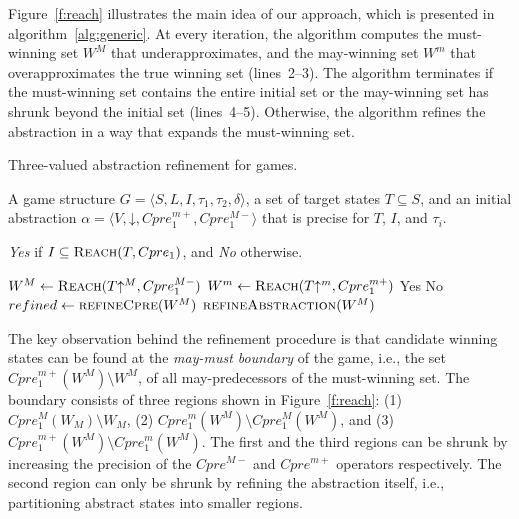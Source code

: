 \documentclass{article}
\newcommand{\reach}[0]{\textsc{Reach}}
\newcommand{\concrete}[1]{#1\mathord{\downarrow}}
\newcommand{\abstractm}[1]{#1\mathord{\uparrow^m}}
\newcommand{\abstractM}[1]{#1\mathord{\uparrow^M}}
\begin{document}
Figure~\ref{f:reach} illustrates the main idea of our approach, 
which is presented in algorithm~\ref{alg:generic}.  At every 
iteration, the algorithm computes the must-winning set $W^M$ that 
underapproximates, and the may-winning set $W^m$ that 
overapproximates the true winning set (lines~2--3).  The algorithm 
terminates if the must-winning set contains the entire initial set 
or the may-winning set has shrunk beyond the initial set 
(lines~4--5).  Otherwise, the algorithm refines the abstraction in 
a way that expands the must-winning set.

\begin{algorithm}[t]
\caption{Three-valued abstraction refinement for games.}
\label{alg:generic}

\begin{algorithmic}[1]

     A game structure $G = \langle S, L, I, \tau_1, \tau_2, \delta \rangle$, a set 
    of target states $T\subseteq S$, and an initial abstraction $\alpha=\langle V, \concrete{}, Cpre_1^{m+}, Cpre_1^{M-} \rangle$
    that is precise for $T$, $I$, and $\tau_i$.

     {\it Yes} if $I \subseteq \reach(T, Cpre_1)$, and {\it No} otherwise.

    \Loop
        \State $W^M \gets \reach(\abstractM{T}, Cpre_1^{M-})$
        \State $W^m \gets \reach(\abstractm{T}, Cpre_1^{m+})$
        \If{$\abstractM{I} \subseteq W^M$} 
            \State\Return Yes
        \ElsIf{$\abstractM{I} \nsubseteq W^m$} 
            \State\Return No
        \Else       
            \State $refined \gets \Call{refineCpre}{W^M}$
                \State$\Call{refineAbstraction}{W^M}$
            \EndIf
        \EndIf
    \EndLoop
\end{algorithmic}
\end{algorithm}

The key observation behind the refinement procedure is that 
candidate winning states can be found at the \emph{may-must 
boundary} of the game, i.e., the set $Cpre_1^{m+}(W^M)\setminus 
W^M$, of all may-predecessors of the must-winning set.  The 
boundary consists of three regions shown in Figure~\ref{f:reach}: 
(1) $Cpre_1^{M}(W_M)\setminus W_M$, (2) $Cpre_1^m(W^M)\setminus 
Cpre_1^{M}(W^M)$, and (3) $Cpre_1^{m+}(W^M)\setminus 
Cpre_1^{m}(W^M)$.  The first and the third regions can be shrunk 
by increasing the precision of the $Cpre^{M-}$ and $Cpre^{m+}$ 
operators respectively.  The second region can only be shrunk by 
refining the abstraction itself, i.e., partitioning abstract 
states into smaller regions.
\end{document}
